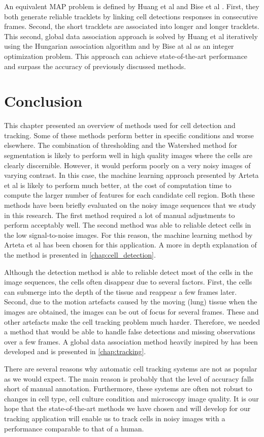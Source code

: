 An equivalent MAP problem is defined by Huang et al \cite{huang08} and Bise et al \cite{bise11global}. First, they both generate reliable tracklets by linking cell detections responses in consecutive frames. Second, the short tracklets are associated into longer and longer tracklets. This second, global data association approach is solved by Huang et al iteratively using the Hungarian association algorithm \cite{kuhn55} and by Bise at al as an integer optimization problem. This approach can achieve state-of-the-art performance and surpass the accuracy of previously discussed methods.

\section{Conclusion \statusfirstdraft}
\label{sec:conclusionmethods}
This chapter presented an overview of methods used for cell detection and tracking. Some of these methods perform better in specific conditions and worse elsewhere. The combination of thresholding and the Watershed method for segmentation is likely to perform well in high quality images where the cells are clearly discernible. However, it would perform poorly on a very noisy images of varying contrast. In this case, the machine learning approach presented by Arteta et al is likely to perform much better, at the cost of computation time to compute the larger number of features for each candidate cell region. Both these methods have been briefly evaluated on the noisy image sequences that we study in this research. The first method required a lot of manual adjustments to perform acceptably well. The second method was able to reliable detect cells in the low signal-to-noise images. For this reason, the machine learning method by Arteta et al has been chosen for this application. A more in depth explanation of the method is presented in \cref{chap:cell_detection}.

Although the detection method is able to reliable detect most of the cells in the image sequences, the cells often disappear due to several factors. First, the cells can submerge into the depth of the tissue and reappear a few frames later. Second, due to the motion artefacts caused by the moving (lung) tissue when the images are obtained, the images can be out of focus for several frames. These and other artefacts make the cell tracking problem much harder. Therefore, we needed a method that would be able to handle false detections and missing observations over a few frames. A global data association method heavily inspired by \cite{bise11global} has been developed and is presented in \cref{chap:tracking}.

There are several reasons why automatic cell tracking systems are not as popular as we would expect. The main reason is probably that the level of accuracy falls short of manual annotation. Furthermore, these systems are often not robust to changes in cell type, cell culture condition and microscopy image quality. It is our hope that the state-of-the-art methods we have chosen and will develop for our tracking application will enable us to track cells in noisy images with a performance comparable to that of a human.